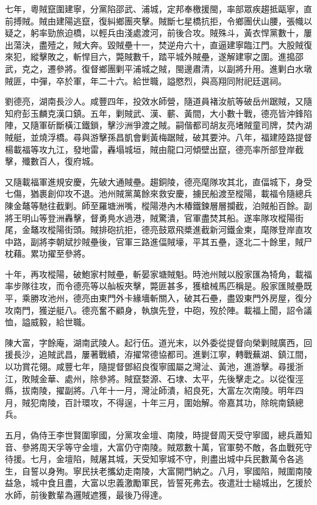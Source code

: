\begin{pinyinscope}
七年，粵賊竄圍建寧，分黨陷邵武、浦城，定邦奉檄援閩，率部眾疾趨抵甌寧，直前搏賊。賊由建陽逃竄，復糾鄉團夾擊。賊斷七星橋抗拒，令鄉團伏山腰，張幟以疑之，躬率勁旅迫橋，以輕兵由淺處渡河，前後合攻。賊殊斗，黃衣悍黨數十，屢出蕩決，盡殪之，賊大奔。毀賊壘十一，焚逆舟六十，直逼建寧臨江門。大股賊復來犯，縱擊敗之，斬悍目六，斃賊數千，踏平城外賊壘，遂解建寧之圍。進搗邵武，克之，遷參將。復督鄉團剿平浦城之賊，閩邊肅清，以副將升用。進剿白水墩賊匪，中彈，卒於軍，年二十六。給世職，謚愍烈，與高翔同附祀廷選祠。

劉德亮，湖南長沙人。咸豐四年，投效水師營，隨道員褚汝航等破岳州踞賊，又隨知府彭玉麟克漢口鎮。五年，剿賊武、漢、蘄、黃間，大小數十戰，德亮皆沖鋒陷陣，又隨軍斫斷橫江鐵鎖，擊沙洲爭渡之賊。嗣偕都司胡友亮堵賊童司牌，焚內湖賊艇，並燒浮橋。尋與游擊孫昌凱會剿黃梅踞賊，破其要沖。八年，福建陸路提督楊載福等攻九江，發地雷，轟塌城垣，賊由龍口河傾壁出竄，德亮率所部登岸截擊，殲數百人，復府城。

又隨載福軍進規安慶，先破大通賊壘。趨銅陵，德亮麾隊攻其北，直偪城下，身受七傷，猶裹創仰攻不退。池州賊黨萬餘來救安慶，擄民船渡至樅陽，載福令隨總兵陳金鼇等馳往截剿。師至羅塘洲嘴，樅陽港內木椿鐵鍊層層攔截，泊賊船百餘。副將王明山等登洲轟擊，督勇鳧水過港，賊驚潰，官軍盡焚其船。遂率隊攻樅陽街尾，金鼇攻樅陽街頭。賊排砲抗拒，德亮鼓眾飛槳進截新河鐵金柬，麾隊登岸直攻中路，副將李朝斌抄賊壘後，官軍三路進偪賊壕，平其五壘，逐北二十餘里，賊尸枕藉。累功擢至參將。

十年，再攻樅陽，破鮑家村賊壘，斬晏家塘賊魁。時池州賊以殷家匯為犄角，載福率步隊往攻，而令德亮等以舢板夾擊，斃匪甚多，獲槍械馬匹稱是。殷家匯賊壘既平，乘勝攻池州，德亮由東門外卡緣墻斬關入，破其石壘，盡毀東門外房屋，復分攻南門，獲逆艇八。德亮奮不顧身，執旗先登，中砲，歿於陣。載福上聞，詔令議恤，謚威毅，給世職。

陳大富，字餘庵，湖南武陵人。起行伍。道光末，以外委從提督向榮剿賊廣西，回援長沙，追賊武昌，屢著戰績，洊擢常德協都司。進剿江寧，轉戰蕪湖、鎮江間，以功賞花翎。咸豐七年，隨提督鄧紹良復寧國屬之灣沚、黃池，進游擊。尋援浙江，敗賊金華、處州，除參將。賊竄婺源、石埭、太平，先後擊走之。以從復涇縣，拔南陵，擢副將。八年十一月，灣沚師潰，紹良死，大富左次南陵。明年四月，賊犯南陵，百計環攻，不得逞，十年三月，圍始解。帝嘉其功，除皖南鎮總兵。

五月，偽侍王李世賢圍寧國，分黨攻金壇、南陵，時提督周天受守寧國，總兵蕭知音、參將周天孚等守金壇，大富仍守南陵。賊眾數十萬，官軍勢不敵，各血戰死守待援。七月，金壇陷，賊屠其城，天受知寧城不守，則盡出城中兵民數萬令各逃生，自誓以身殉。寧民扶老攜幼走南陵，大富開門納之。八月，寧國陷，賊圍南陵益急，城中食且盡，大富以忠義激勵軍民，皆誓死弗去。夜遣壯士縋城出，乞援於水師，前後數輩為邏賊遮獲，最後乃得達。


\end{pinyinscope}
